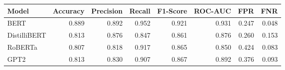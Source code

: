 \begin{tabular}{|l||r|r|r|r|r|r|r|}
\toprule
Model & \textbf{Accuracy} & \textbf{Precision} & Recall & \textbf{F1-Score} & \textbf{ROC-AUC} & \textbf{FPR} & FNR \\
\midrule \midrule
BERT & 0.889 & 0.892 & 0.952 & 0.921 & 0.931 & 0.247 & 0.048 \\
DistilliBERT & 0.813 & 0.876 & 0.847 & 0.861 & 0.876 & 0.260 & 0.153 \\
RoBERTa & 0.807 & 0.818 & 0.917 & 0.865 & 0.850 & 0.424 & 0.083 \\
GPT2 & 0.813 & 0.830 & 0.907 & 0.867 & 0.892 & 0.376 & 0.093 \\
\bottomrule
\end{tabular}

